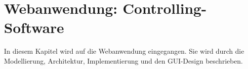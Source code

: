 

\chapter{Webanwendung: Controlling-Software}

In diesem Kapitel wird auf die Webanwendung eingegangen.
Sie wird durch die Modellierung, Architektur, Implementierung und den GUI-Design beschrieben.













